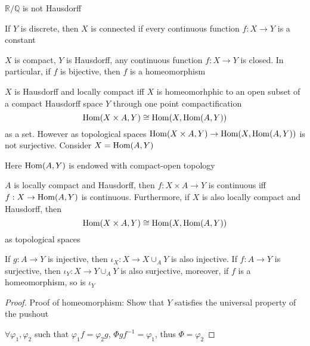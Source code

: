 \documentclass[../main.tex]{subfiles}
\begin{document}
\begin{example}
$\mathbb R/\mathbb Q$ is not Hausdorff
\end{example}

\begin{proposition}
If $Y$ is discrete, then $X$ is connected if every continuous function $f:X\to Y$ is a constant
\end{proposition}

\begin{proposition}
$X$ is compact, $Y$ is Hausdorff, any continuous function $f:X\to Y$ is closed. In particular, if $f$ is bijective, then $f$ is a homeomorphism
\end{proposition}

\begin{fact}
$X$ is Hausdorff and locally compact iff $X$ is homeomorhphic to an open subset of a compact Hausdorff space $Y$ through one point compactification
\[\operatorname{Hom}(X\times A,Y)\cong\operatorname{Hom}(X,\operatorname{Hom}(A,Y))\]
as a set. However as topological spaces $\operatorname{Hom}(X\times A,Y)\to\operatorname{Hom}(X,\operatorname{Hom}(A,Y))$ is not surjective. Consider $X=\operatorname{Hom}(A,Y)$
\end{fact}

\begin{note}
Here $\operatorname{Hom}(A,Y)$ is endowed with compact-open topology
\end{note}

\begin{theorem}
$A$ is locally compact and Hausdorff, then $f:X\times A\to Y$ is continuous iff $f:X\to\operatorname{Hom}(A,Y)$ is continuous. Furthermore, if $X$ is also locally compact and Hausdorff, then
\[\operatorname{Hom}(X\times A,Y)\cong\operatorname{Hom}(X,\operatorname{Hom}(A,Y))\]
as topological spaces
\end{theorem}

\begin{proposition}
If $g:A\to Y$ is injective, then $\iota_X:X\to X\cup_AY$ is also injective. If $f:A\to Y$ is surjective, then $\iota_Y:X\to Y\cup_AY$ is also surjective, moreover, if $f$ is a homeomorphism, so is $\iota_Y$
\end{proposition}

\begin{proof}
Proof of homeomorphism: Show that $Y$ satisfies the universal property of the pushout
\begin{center}
\end{center}
$\forall \varphi_1,\varphi_2$ such that $\varphi_1f=\varphi_2g$, $\Phi gf^{-1}=\varphi_1$, thus $\Phi=\varphi_2$
\end{proof}
\end{document}
